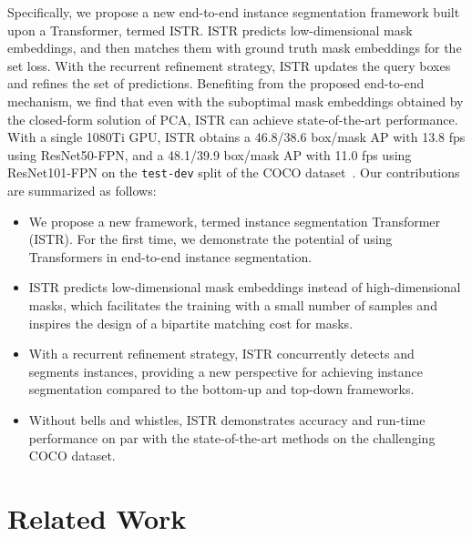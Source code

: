 \documentclass[10pt,twocolumn,letterpaper]{article}
\begin{document}
Specifically, we propose a new end-to-end instance segmentation framework built upon a Transformer, termed ISTR.
ISTR predicts low-dimensional mask embeddings, and then matches them with ground truth mask embeddings for the set loss.
With the recurrent refinement strategy, ISTR updates the query boxes and refines the set of predictions.
Benefiting from the proposed end-to-end mechanism, we find that even with the suboptimal mask embeddings obtained by the closed-form solution of PCA, ISTR can achieve state-of-the-art performance.
With a single 1080Ti GPU, ISTR obtains a 46.8/38.6 box/mask AP with 13.8 fps using ResNet50-FPN, and a 48.1/39.9 box/mask AP with 11.0 fps using ResNet101-FPN on the \texttt{test-dev} split of the COCO dataset~\cite{lin2014microsoft}.
Our contributions are summarized as follows:
\begin{itemize}
 \vspace{-5px}
 \item We propose a new framework, termed instance segmentation Transformer (ISTR). For the first time, we demonstrate the potential of using Transformers in end-to-end instance segmentation.\vspace{-5px}
 \item ISTR predicts low-dimensional mask embeddings instead of high-dimensional masks, which facilitates the training with a small number of samples and inspires the design of a bipartite matching cost for masks.\vspace{-5px}
 \item With a recurrent refinement strategy, ISTR concurrently detects and segments instances, providing a new perspective for achieving instance segmentation compared to the bottom-up and top-down frameworks.\vspace{-5px}
 \item Without bells and whistles, ISTR demonstrates accuracy and run-time performance on par with the state-of-the-art methods on the challenging COCO dataset.
\end{itemize}

\section{Related Work}
\end{document}
